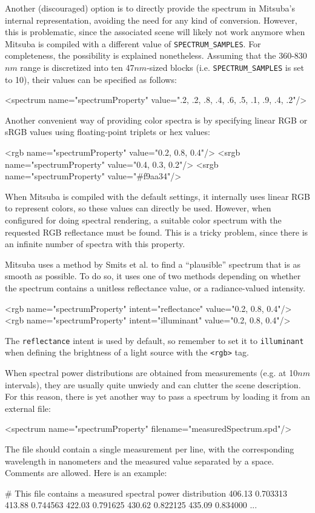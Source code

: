 Another (discouraged) option is to directly provide the spectrum in Mitsuba's
internal representation, avoiding the need for any kind of conversion. 
However, this is problematic, since the associated scene will likely not work
anymore when Mitsuba is compiled with a different value of 
\texttt{SPECTRUM\_SAMPLES}. 
For completeness, the possibility is explained nonetheless. Assuming that 
the 360-830$nm$ range is discretized into ten 47$nm$-sized blocks 
(i.e. \texttt{SPECTRUM\_SAMPLES} is set to 10), their values can be specified 
as follows:
\begin{xml}
<spectrum name="spectrumProperty" value=".2, .2, .8, .4, .6, .5, .1, .9, .4, .2"/>
\end{xml}

Another convenient way of providing color spectra is by specifying linear RGB 
or sRGB values using floating-point triplets or hex values:
\begin{xml}
<rgb name="spectrumProperty" value="0.2, 0.8, 0.4"/>
<srgb name="spectrumProperty" value="0.4, 0.3, 0.2"/>
<srgb name="spectrumProperty" value="#f9aa34"/>
\end{xml}
When Mitsuba is compiled with the default settings, it internally uses 
linear RGB to represent colors, so these values can directly be used. 
However, when configured for doing spectral rendering, a suitable color
spectrum with the requested RGB reflectance must be found. This is a tricky
problem, since there is an infinite number of spectra with this property.

Mitsuba uses a method by Smits et al. \cite{Smits2005RGB} to find a
``plausible'' spectrum that is as smooth as possible. To do so, it uses
one of two methods depending on whether the spectrum contains a
unitless reflectance value, or a radiance-valued intensity.
\begin{xml}
<rgb name="spectrumProperty" intent="reflectance" value="0.2, 0.8, 0.4"/>
<rgb name="spectrumProperty" intent="illuminant" value="0.2, 0.8, 0.4"/>
\end{xml}
The \texttt{reflectance} intent is used by default, so remember to
set it to \texttt{illuminant} when defining the brightness of a
light source with the \texttt{<rgb>} tag.

When spectral power distributions are obtained from measurements 
(e.g. at 10$nm$ intervals), they are usually quite unwiedy and can clutter
the scene description. For this reason, there is yet another way to pass 
a spectrum by loading it from an external
file:
\begin{xml}
<spectrum name="spectrumProperty" filename="measuredSpectrum.spd"/>
\end{xml}
The file should contain a single measurement per line, with the corresponding
wavelength in nanometers and the measured value separated by a space. Comments
are allowed. Here is an example:
\begin{xml}
# This file contains a measured spectral power distribution
406.13 0.703313
413.88 0.744563
422.03 0.791625
430.62 0.822125
435.09 0.834000
...
\end{xml}

